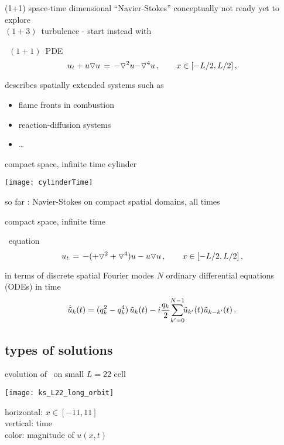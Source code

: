 \begin{frame}{(1+1) space-time dimensional ``Navier-Stokes''}
conceptually not ready yet to explore \\ %
$(1+3)$\dmn\ turbulence - start instead with

\bigskip

\begin{block}{\KS\ $(1+1)$\dmn\ PDE}
\[
  u_t + u \triangledown u \,=\,
    {\color{red}-}\triangledown^2 u {\color{red}-\triangledown^4 u}
    \,,\qquad   x \in [-L/2,L/2]
    \,,
\]
\end{block}

\bigskip

describes spatially extended systems such as
\begin{itemize}
 \item flame fronts in combustion
 \item reaction-diffusion systems
 \item \ldots
\end{itemize}

\end{frame}

\begin{frame}{compact space, infinite time cylinder}
\begin{center}
\texttt{[image: cylinderTime]}
\end{center}
so far : Navier-Stokes on compact spatial domains, all times
\end{frame}

\begin{frame}{compact space, infinite time} %
\begin{block}{\KS\ equation}
\[
  u_t \,=\,
    -({\color{red}+}\triangledown^2 +{\color{red}\triangledown^4}) u
    - u \triangledown u
    \,,\qquad   x \in [-L/2,L/2]
    \,,
\]
\end{block}

\bigskip

\begin{block}{in terms of discrete spatial Fourier modes}
$N$ ordinary differential equations (ODEs) in time
\[
\dot{\Fu}_k(\zeit) = ( q_k^2 - q_k^4 )\, \Fu_k(\zeit)
- i \frac{q_k}{2} \!\sum_{k'=0}^{N-1} \!\!\Fu_{k'}(\zeit) \Fu_{k-k'}(\zeit)
\,.
\]
\end{block}
\end{frame}


\subsection{types of solutions}
\begin{frame}{evolution of \KS\ on small $L=22$ cell}
\begin{center}
  \texttt{[image: ks\_L22\_long\_orbit]}
\end{center}
horizontal: $x \in [-11,11]$
\\
vertical: time
\\
color: magnitude of $u(x,t)$
\end{frame}

